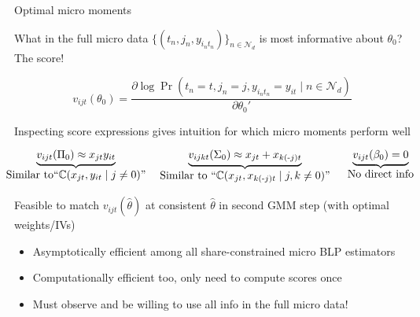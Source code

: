 \begin{frame}[label=optimal]{Optimal micro moments}
    \begin{wideitemize}
        \item What in the full micro data $\{(t_n, j_n, y_{i_nt_n})\}_{n \in \mathcal{N}_d}$ is \alert{most informative} about $\theta_0$? The \alert{score}!
    \end{wideitemize}
    \begin{equation*}
        v_{ijt}(\theta_0) = \frac{\partial\log\Pr(t_n = t, j_n = j, y_{i_nt_n} = y_{it} \mid n \in \mathcal{N}_d)}{\partial\theta_0'}
    \end{equation*}
    
    \begin{wideitemize}
        \item Inspecting score expressions \alert{gives intuition} for which micro moments perform well
    \end{wideitemize}
    \begin{equation*}
        \hspace{2em}\underbrace{v_{ijt}(\Pi_0) \approx x_{jt} y_{it}}_{\mathclap{\textstyle\text{Similar to``$\Cov(x_{jt}, y_{it} \mid j \neq 0)$''}}} \hspace{6.5em} \underbrace{v_{ijkt}(\Sigma_0) \approx x_{jt} + x_{k(\text{-}j)t}}_{\mathclap{\textstyle\text{Similar to ``$\Cov(x_{jt}, x_{k(\text{-}j)t} \mid j, k \neq 0)$''}}} \hspace{4.5em} \underbrace{v_{ijt}(\beta_0) = 0}_{\mathclap{\textstyle\text{No direct info}}}
    \end{equation*}
    
    \begin{wideitemize}
        \item Feasible to match $v_{ijt}(\hat{\theta})$ at consistent $\hat{\theta}$ in second GMM step (with optimal weights/IVs)
        \begin{itemize}
            \item \alert{Asymptotically efficient} among all \alert{share-constrained} micro BLP estimators
            \item \alert{Computationally efficient} too, only need to compute scores once
            \item Must observe and be willing to use all info in the full micro data!
        \end{itemize}
    \end{wideitemize}
\end{frame}

